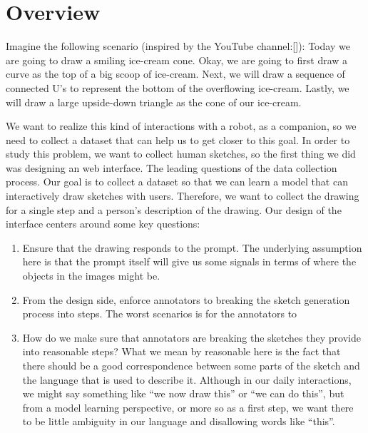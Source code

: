 \section{Overview}
Imagine the following scenario (inspired by the YouTube channel:[]):
Today we are going to draw a smiling ice-cream cone. Okay, we are going to first draw a curve as the top of a big scoop of ice-cream. Next, we will draw a sequence of connected U's to represent the bottom of the overflowing ice-cream. Lastly, we will draw a large upside-down triangle as the cone of our ice-cream.

We want to realize this kind of interactions with a robot, as a companion, so we need to collect a dataset that can help us to get closer to this goal. In order to study this problem, we want to collect human sketches, so the first thing we did was designing an web interface.  
The leading questions of the data collection process. Our goal is to collect a dataset so that we can learn a model that can interactively draw sketches with users. Therefore, we want to collect the drawing for a single step and a person's description of the drawing. Our design of the interface centers around some key questions: 
\begin{enumerate}
    \item \label{data_design_3} Ensure that the drawing responds to the prompt. The underlying assumption here is that the prompt itself will give us some signals in terms of where the objects in the images might be.  
    \item \label{data_design_1} From the design side, enforce annotators to breaking the sketch generation process into steps. The worst scenarios is for the annotators to   
    \item \label{data_design_2} How do we make sure that annotators are breaking the sketches they provide into reasonable steps? What we mean by reasonable here is the fact that there should be a good correspondence between some parts of the sketch and the language that is used to describe it. Although in our daily interactions, we might say something like ``we now draw this'' or ``we can do this'', but from a model learning perspective, or more so as a first step, we want there to be little ambiguity in our language and disallowing words like ``this''.     
\end{enumerate}



